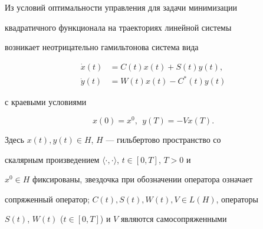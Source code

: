 \date{}




\pagestyle{plain} %







\maketitle


\label{begin}











Из условий оптимальности управления для задачи минимизации


квадратичного функционала на траекториях линейной системы


возникает неотрицательно гамильтонова система вида


\begin{equation}


\begin{split}


\Dot x(t)&=C(t)x(t)+S(t)y(t),\\


\Dot y(t)&=W(t)x(t)-C^{*}(t)y(t)


\end{split}


\end{equation}


с краевыми условиями


\begin{equation}


x(0)=x^{0},\ \ y(T)=-Vx(T).


\end{equation}


Здесь $x(t), y(t)\in H$, $H$ --- гильбертово пространство со


скалярным произведением $\langle\cdot,\cdot\rangle$, $t\in [0, T]$, $T>0$ и


$x^{0}\in


H$ фиксированы, звездочка при обозначении оператора означает


сопряженный оператор; $C(t), S(t), W(t), V\in L(H)$, операторы


$S(t)$, $W(t)$ ($t\in [0,T]$) и $V$ являются самосопряженными


